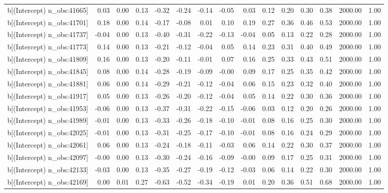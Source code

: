 \begin{table}[ht]
\begin{tabular}{rrrrrrrrrrrrrrr}
  b[(Intercept) n\_obs:41665] & 0.03 & 0.00 & 0.13 & -0.32 & -0.24 & -0.14 & -0.05 & 0.03 & 0.12 & 0.20 & 0.30 & 0.38 & 2000.00 & 1.00 \\ 
  b[(Intercept) n\_obs:41701] & 0.18 & 0.00 & 0.14 & -0.17 & -0.08 & 0.01 & 0.10 & 0.19 & 0.27 & 0.36 & 0.46 & 0.53 & 2000.00 & 1.00 \\ 
  b[(Intercept) n\_obs:41737] & -0.04 & 0.00 & 0.13 & -0.40 & -0.31 & -0.22 & -0.13 & -0.04 & 0.05 & 0.13 & 0.22 & 0.28 & 2000.00 & 1.00 \\ 
  b[(Intercept) n\_obs:41773] & 0.14 & 0.00 & 0.13 & -0.21 & -0.12 & -0.04 & 0.05 & 0.14 & 0.23 & 0.31 & 0.40 & 0.49 & 2000.00 & 1.00 \\ 
  b[(Intercept) n\_obs:41809] & 0.16 & 0.00 & 0.13 & -0.20 & -0.11 & -0.01 & 0.07 & 0.16 & 0.25 & 0.33 & 0.43 & 0.51 & 2000.00 & 1.00 \\ 
  b[(Intercept) n\_obs:41845] & 0.08 & 0.00 & 0.14 & -0.28 & -0.19 & -0.09 & -0.00 & 0.09 & 0.17 & 0.25 & 0.35 & 0.42 & 2000.00 & 1.00 \\ 
  b[(Intercept) n\_obs:41881] & 0.06 & 0.00 & 0.14 & -0.29 & -0.21 & -0.12 & -0.04 & 0.06 & 0.15 & 0.23 & 0.32 & 0.40 & 2000.00 & 1.00 \\ 
  b[(Intercept) n\_obs:41917] & 0.05 & 0.00 & 0.13 & -0.26 & -0.20 & -0.12 & -0.04 & 0.05 & 0.14 & 0.22 & 0.30 & 0.36 & 2000.00 & 1.00 \\ 
  b[(Intercept) n\_obs:41953] & -0.06 & 0.00 & 0.13 & -0.37 & -0.31 & -0.22 & -0.15 & -0.06 & 0.03 & 0.12 & 0.20 & 0.26 & 2000.00 & 1.00 \\ 
  b[(Intercept) n\_obs:41989] & -0.01 & 0.00 & 0.13 & -0.33 & -0.26 & -0.18 & -0.10 & -0.01 & 0.08 & 0.16 & 0.25 & 0.30 & 2000.00 & 1.00 \\ 
  b[(Intercept) n\_obs:42025] & -0.01 & 0.00 & 0.13 & -0.31 & -0.25 & -0.17 & -0.10 & -0.01 & 0.08 & 0.16 & 0.24 & 0.29 & 2000.00 & 1.00 \\ 
  b[(Intercept) n\_obs:42061] & 0.06 & 0.00 & 0.13 & -0.24 & -0.18 & -0.11 & -0.03 & 0.06 & 0.14 & 0.22 & 0.30 & 0.37 & 2000.00 & 1.00 \\ 
  b[(Intercept) n\_obs:42097] & -0.00 & 0.00 & 0.13 & -0.30 & -0.24 & -0.16 & -0.09 & -0.00 & 0.09 & 0.17 & 0.25 & 0.31 & 2000.00 & 1.00 \\ 
  b[(Intercept) n\_obs:42133] & -0.03 & 0.00 & 0.13 & -0.35 & -0.27 & -0.19 & -0.12 & -0.03 & 0.06 & 0.14 & 0.22 & 0.30 & 2000.00 & 1.00 \\ 
  b[(Intercept) n\_obs:42169] & 0.00 & 0.01 & 0.27 & -0.63 & -0.52 & -0.34 & -0.19 & 0.01 & 0.20 & 0.36 & 0.51 & 0.68 & 2000.00 & 1.00 \\ 

\end{tabular}
\end{table}
